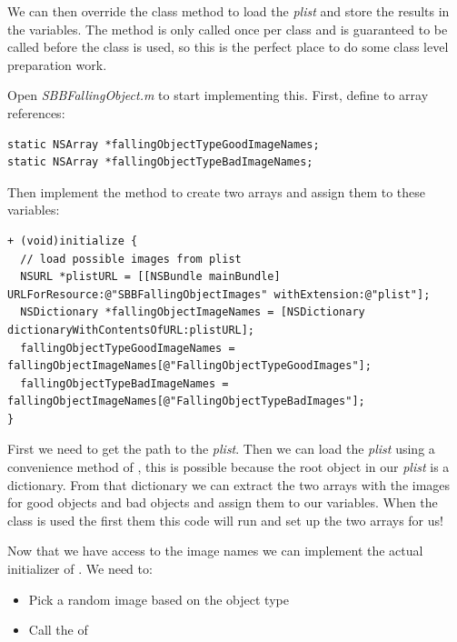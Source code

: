 We can then override the class method  to load the
\textit{plist} and store the results in the  variables. The
 method is only called once per class and is guaranteed
to be called before the class is used, so this is the perfect place to do some
class level preparation work.

Open \textit{SBBFallingObject.m} to start implementing
this. First, define to  array references:
\begin{lstlisting}
static NSArray *fallingObjectTypeGoodImageNames;
static NSArray *fallingObjectTypeBadImageNames;
\end{lstlisting}
Then implement the  method to create two arrays and
assign them to these variables:
\begin{lstlisting}
+ (void)initialize {
  // load possible images from plist
  NSURL *plistURL = [[NSBundle mainBundle] URLForResource:@"SBBFallingObjectImages" withExtension:@"plist"];
  NSDictionary *fallingObjectImageNames = [NSDictionary dictionaryWithContentsOfURL:plistURL];
  fallingObjectTypeGoodImageNames = fallingObjectImageNames[@"FallingObjectTypeGoodImages"];
  fallingObjectTypeBadImageNames = fallingObjectImageNames[@"FallingObjectTypeBadImages"];
}
\end{lstlisting}
First we need to get the path to the \textit{plist}. Then we can load the
\textit{plist} using a convenience method of , this is
possible because the root object in our \textit{plist} is a dictionary. From
that dictionary we can extract the two arrays with the images for good objects
and bad objects and assign them to our  variables. When the
 class is used the first them this code will run
and set up the two arrays for us!

Now that we have access to the image names we can implement the actual
initializer of . We need to:
\begin{itemize}
  \item Pick a random image based on the object type
  \item Call the  of \ccsprite{}
\end{itemize}

